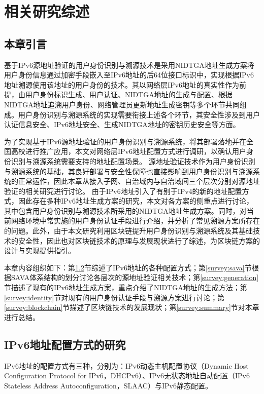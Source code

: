 
\chapter{相关研究综述}
\label{survey}

  \section{本章引言}
  \label{survey:introduction}
  基于IPv6源地址验证的用户身份识别与溯源技术是采用NIDTGA地址生成方案将用户身份信息通过加密手段嵌入至IPv6地址的后64位接口标识中，实现根据IPv6地址溯源使用该地址的用户身份的技术。其以网络层IPv6地址的真实性作为前提，由用户身份标识生成、用户认证、NIDTGA地址的生成与配置、根据NIDTGA地址追溯用户身份、网络管理员更新地址生成密钥等多个环节共同组成。用户身份识别与溯源系统的实现需要衔接上述各个环节，其安全性涉及到用户认证信息安全、IPv6地址安全、生成NIDTGA地址的密钥历史安全等方面。
  
  为了实现基于IPv6源地址验证的用户身份识别与溯源系统，将其部署落地并在全国高校进行推广应用，本文对网络层IPv6地址配置方式进行调研，以确认用户身份识别与溯源系统需要支持的地址配置场景。
  源地址验证技术作为用户身份识别与溯源系统的基础，其良好部署与安全性保障也直接影响到用户身份识别与溯源系统的正常运作，因此本章从接入子网、自治域内与自治域间三个层次分别对源地址验证的相关研究进行讨论。
  由于IPv6地址引入了有别于IPv4的新的地址配置方式，因此存在多种IPv6地址生成方案的研究，本文对各方案的侧重点进行讨论，其中包含用户身份识别与溯源技术所采用的NIDTGA地址生成方案。同时，对当前网络环境中常实施的用户身份认证手段进行介绍，并分析了常见溯源方案所存在的问题。此外，由于本文研究利用区块链提升用户身份识别与溯源系统及其基础技术的安全性，因此也对区块链技术的原理与发展现状进行了综述，为区块链方案的设计与实现提供指引。

  本章内容组织如下：第\ref{survey:configuration}节综述了IPv6地址的各种配置方式；第\ref{survey:sava}节根据SAVA体系结构的划分讨论各层次的源地址验证相关技术；第\ref{survey:generation}节描述了现有的IPv6地址生成方案，重点介绍了NIDTGA地址的生成方法；第\ref{survey:identity}节对现有的用户身份认证手段与溯源方案进行讨论；第\ref{survey:blockchain}节描述了区块链技术的发展现状；第\ref{survey:summary}节对本章进行总结。

  \section{IPv6地址配置方式的研究}
  \label{survey:configuration}
  IPv6地址的配置方式有三种，分别为：IPv6动态主机配置协议（Dynamic Host Configuration Protocol for IPv6，DHCPv6）\cite{RFC8415}、IPv6无状态地址自动配置（IPv6 Stateless Address Autoconfiguration，SLAAC）\cite{RFC2462}与IPv6静态配置。

